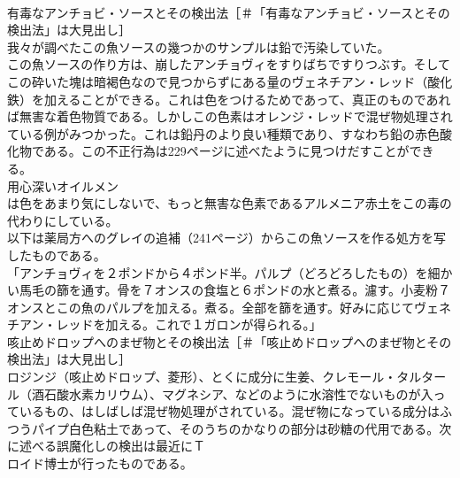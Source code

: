 \documentclass[8pt]{extreport}
\begin{document}
\begin{CJK}{UTF8}{min}
\\	有毒なアンチョビ・ソースとその検出法［＃「有毒なアンチョビ・ソースとその検出法」は大見出し］
\\	我々が調べたこの魚ソースの幾つかのサンプルは鉛で汚染していた。
\\	この魚ソースの作り方は、崩したアンチョヴィをすりばちですりつぶす。そしてこの砕いた塊は暗褐色なので見つからずにある量のヴェネチアン・レッド（酸化鉄）を加えることができる。これは色をつけるためであって、真正のものであれば無害な着色物質である。しかしこの色素はオレンジ・レッドで混ぜ物処理されている例がみつかった。これは鉛丹のより良い種類であり、すなわち鉛の赤色酸化物である。この不正行為は229ページに述べたように見つけだすことができる。
\\	用心深いオイルメン
\\	は色をあまり気にしないで、もっと無害な色素であるアルメニア赤土をこの毒の代わりにしている。
\\	以下は薬局方へのグレイの追補（241ページ）からこの魚ソースを作る処方を写したものである。
\\	「アンチョヴィを２ポンドから４ポンド半。パルプ（どろどろしたもの）を細かい馬毛の篩を通す。骨を７オンスの食塩と６ポンドの水と煮る。濾す。小麦粉７オンスとこの魚のパルプを加える。煮る。全部を篩を通す。好みに応じてヴェネチアン・レッドを加える。これで１ガロンが得られる。」
\\	咳止めドロップへのまぜ物とその検出法［＃「咳止めドロップへのまぜ物とその検出法」は大見出し］
\\	ロジンジ（咳止めドロップ、菱形）、とくに成分に生姜、クレモール・タルタール（酒石酸水素カリウム）、マグネシア、などのように水溶性でないものが入っているもの、はしばしば混ぜ物処理がされている。混ぜ物になっている成分はふつうパイプ白色粘土であって、そのうちのかなりの部分は砂糖の代用である。次に述べる誤魔化しの検出は最近にＴ
\\	ロイド博士が行ったものである。

\end{CJK}
\end{document}
